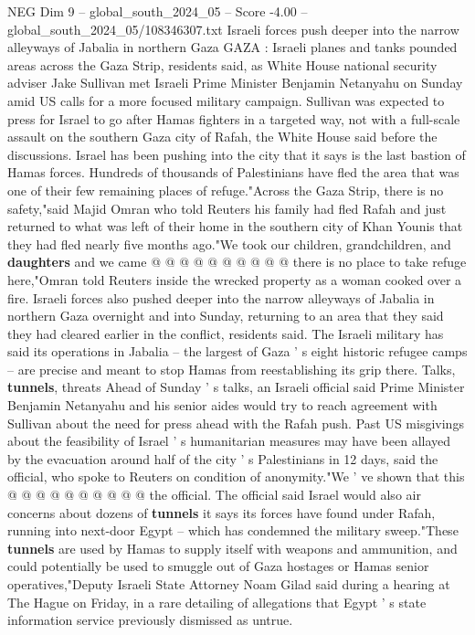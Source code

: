 \begin{textsample}{NEG Dim 9 – global\_south\_2024\_05 – Score -4.00 – global\_south\_2024\_05/108346307.txt}  \label{ex:f9_neg_407}
Israeli forces push deeper into the narrow alleyways of Jabalia in northern Gaza GAZA : Israeli planes and tanks pounded areas across the Gaza Strip, residents said, as White House national security adviser Jake Sullivan met Israeli Prime Minister Benjamin Netanyahu on Sunday amid US calls for a more focused military campaign.
Sullivan was expected to press for Israel to go after Hamas fighters in a targeted way, not with a full-scale assault on the southern Gaza city of Rafah, the White House said before the discussions.
Israel has been pushing into the city that it says is the last bastion of Hamas forces.
Hundreds of thousands of Palestinians have fled the area that was one of their few remaining places of refuge."Across the Gaza Strip, there is no safety,"said Majid Omran who told Reuters his family had fled Rafah and just returned to what was left of their home in the southern city of Khan Younis that they had fled nearly five months ago."We took our children, grandchildren, and \textbf{daughters} and we came @ @ @ @ @ @ @ @ @ @ there is no place to take refuge here,"Omran told Reuters inside the wrecked property as a woman cooked over a fire.
Israeli forces also pushed deeper into the narrow alleyways of Jabalia in northern Gaza overnight and into Sunday, returning to an area that they said they had cleared earlier in the conflict, residents said.
The Israeli military has said its operations in Jabalia -- the largest of Gaza ' s eight historic refugee camps -- are precise and meant to stop Hamas from reestablishing its grip there.
Talks, \textbf{tunnels}, threats Ahead of Sunday ' s talks, an Israeli official said Prime Minister Benjamin Netanyahu and his senior aides would try to reach agreement with Sullivan about the need for press ahead with the Rafah push.
Past US misgivings about the feasibility of Israel ' s humanitarian measures may have been allayed by the evacuation around half of the city ' s Palestinians in 12 days, said the official, who spoke to Reuters on condition of anonymity."We ' ve shown that this @ @ @ @ @ @ @ @ @ @ the official.
The official said Israel would also air concerns about dozens of \textbf{tunnels} it says its forces have found under Rafah, running into next-door Egypt -- which has condemned the military sweep."These \textbf{tunnels} are used by Hamas to supply itself with weapons and ammunition, and could potentially be used to smuggle out of Gaza hostages or Hamas senior operatives,"Deputy Israeli State Attorney Noam Gilad said during a hearing at The Hague on Friday, in a rare detailing of allegations that Egypt ' s state information service previously dismissed as untrue.

\end{textsample}
